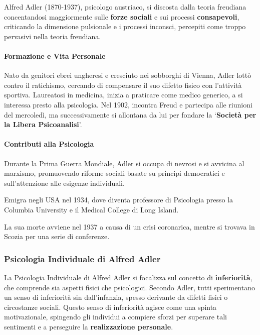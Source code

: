 \documentclass{subfiles}
\begin{document}
Alfred Adler (1870-1937), psicologo austriaco, si discosta dalla teoria freudiana concentandosi 
maggiormente sulle \textbf{forze sociali} e sui processi \textbf{consapevoli}, criticando la 
dimensione pulsionale e i processi inconsci, percepiti come troppo pervasivi nella teoria freudiana. \\

\paragraph*{Formazione e Vita Personale}
Nato da genitori ebrei ungheresi e cresciuto nei sobborghi di Vienna, Adler lottò contro il 
ratichismo, cercando di compensare il suo difetto fisico con l'attività sportiva.
Laureatosi in medicina, inizia a praticare come medico generico, a si interessa presto alla psicologia.
Nel 1902, incontra Freud e partecipa alle riunioni del mercoledì, ma successivamente si allontana da 
lui per fondare la `\textbf{Società per la Libera Psicoanalisi}'.\\

\paragraph*{Contributi alla Psicologia}
Durante la Prima Guerra Mondiale, Adler si occupa di nevrosi e si avvicina al marxismo, promuovendo 
riforme sociali basate su principi democratici e sull'attenzione alle esigenze individuali.

Emigra negli USA nel 1934, dove diventa professore di Psicologia presso la Columbia University e 
il Medical College di Long Island.

La sua morte avviene nel 1937 a causa di un crisi coronarica, mentre si trovava in Scozia per 
una serie di conferenze.\\

\subsubsection{Psicologia Individuale di Alfred Adler}
La Psicologia Individuale di Alfred Adler si focalizza sul concetto di \textbf{inferiorità}, che 
comprende sia aspetti fisici che psicologici. 
Secondo Adler, tutti sperimentano un senso di inferiorità sin dall'infanzia, spesso derivante da 
difetti fisici o circostanze sociali. Questo senso di inferiorità agisce come una spinta 
motivazionale, spingendo gli individui a compiere sforzi per superare tali sentimenti e a 
perseguire la \textbf{realizzazione personale}. \\
\end{document}
